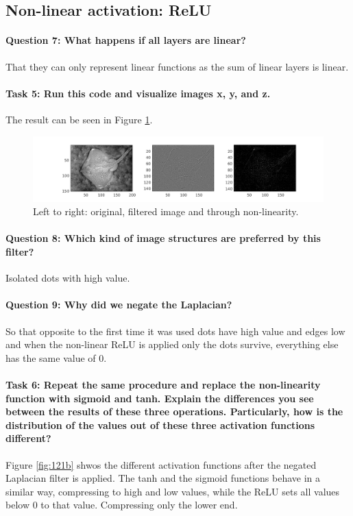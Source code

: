 \documentclass[12pt]{article}
\begin{document}
\subsection{Non-linear activation: ReLU}
\paragraph{Question 7: What happens if all layers are linear?}That they can only represent linear functions as the sum of linear layers is linear.
\paragraph{Task 5: Run this code and visualize images x, y, and z.} The result can be seen in Figure \ref{fig:121}.

\begin{figure}[htbp]
 \centering
 \includegraphics[width=\textwidth]{121}
 \caption{Left to right: original, filtered image and through non-linearity.}
 \label{fig:121}
\end{figure}
\paragraph{Question 8: Which kind of image structures are preferred by this filter?} Isolated dots with high value.
\paragraph{Question 9: Why did we negate the Laplacian?} So that opposite to the first time it was used dots have high value and edges low and when the non-linear ReLU is applied only the dots survive, everything else has the same value of 0.
\paragraph{Task 6: Repeat the same procedure and replace the non-linearity function with sigmoid and tanh. Explain the differences you see between the results of these three operations. Particularly, how is the distribution of the values out of these three activation functions different?} Figure \ref{fig:121b} shwos the different activation functions after the negated Laplacian filter is applied. The tanh and the sigmoid functions behave in a similar way, compressing to high and low values, while the ReLU sets all values below 0 to that value. Compressing only the lower end.
\end{document}
